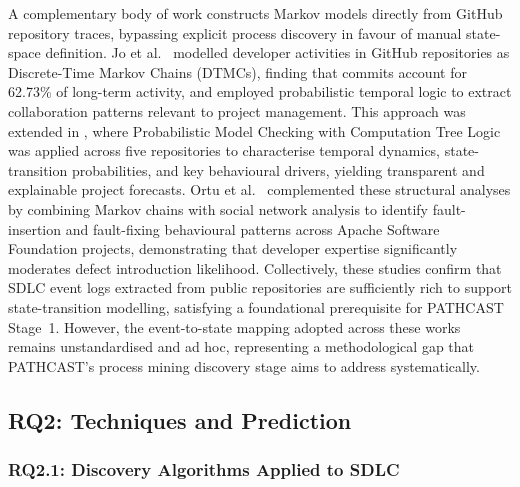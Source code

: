 A complementary body of work constructs Markov models directly from GitHub
repository traces, bypassing explicit process discovery in favour of manual
state-space definition. Jo et al.\ \cite{jo2023} modelled developer activities
in GitHub repositories as Discrete-Time Markov Chains (DTMCs), finding that
commits account for 62.73\% of long-term activity, and employed probabilistic
temporal logic to extract collaboration patterns relevant to project management.
This approach was extended in \cite{jo2024}, where Probabilistic Model Checking
with Computation Tree Logic was applied across five repositories to characterise
temporal dynamics, state-transition probabilities, and key behavioural drivers,
yielding transparent and explainable project forecasts. Ortu et al.\ \cite{ortu2023}
complemented these structural analyses by combining Markov chains with social
network analysis to identify fault-insertion and fault-fixing behavioural patterns
across Apache Software Foundation projects, demonstrating that developer expertise
significantly moderates defect introduction likelihood. Collectively, these studies
confirm that SDLC event logs extracted from public repositories are sufficiently
rich to support state-transition modelling, satisfying a foundational prerequisite
for PATHCAST Stage~1. However, the event-to-state mapping adopted across these
works remains unstandardised and ad hoc, representing a methodological gap that
PATHCAST's process mining discovery stage aims to address systematically.


\subsection{RQ2: Techniques and Prediction}
\label{sec:slr-rq2}

\subsubsection{RQ2.1: Discovery Algorithms Applied to SDLC}

